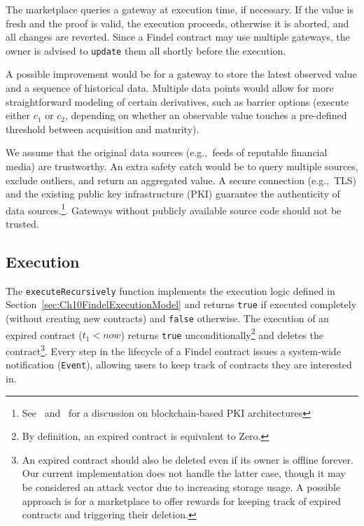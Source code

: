 The marketplace queries a gateway at execution time, if necessary. 
If the value is fresh and the proof is valid, the execution proceeds, otherwise it is aborted, and all changes are reverted.
Since a Findel contract may use multiple gateways, the owner is advised to \texttt{update} them all shortly before the execution.

A possible improvement would be for a gateway to store the latest observed value and a sequence of historical data.
Multiple data points would allow for more straightforward modeling of certain derivatives, such as barrier options (execute either \(c_1\) or \(c_2\), depending on whether an observable value touches a pre-defined threshold between acquisition and maturity).

We assume that the original data sources (e.g.,~feeds of reputable financial media) are trustworthy.
An extra safety catch would be to query multiple sources, exclude outliers, and return an aggregated value.
A secure connection (e.g.,~TLS) and the existing public key infrastructure (PKI) guarantee the authenticity of data sources.\footnote{See~\cite{Fromknecht2014} and~\cite{Lewison2016} for a discussion on blockchain-based PKI architectures}.
Gateways without publicly available source code should not be trusted.


\subsection{Execution} \label{sec:Ch10FindelExecutionImplementation}

The \texttt{executeRecursively} function implements the execution logic defined in Section~\ref{sec:Ch10FindelExecutionModel} and returns \texttt{true} if executed completely (without creating new contracts) and \texttt{false} otherwise.
The execution of an expired contract ($t_1 < now$) returns \texttt{true} unconditionally\footnote{By definition, an expired contract is equivalent to \(\mathrm{Zero}\).} and deletes the contract\footnote{An expired contract should also be deleted even if its owner is offline forever. Our current implementation does not handle the latter case, though it may be considered an attack vector due to increasing storage usage. A possible approach is for a marketplace to offer rewards for keeping track of expired contracts and triggering their deletion.}.
Every step in the lifecycle of a Findel contract issues a system-wide notification (\texttt{Event}), allowing users to keep track of contracts they are interested in.

